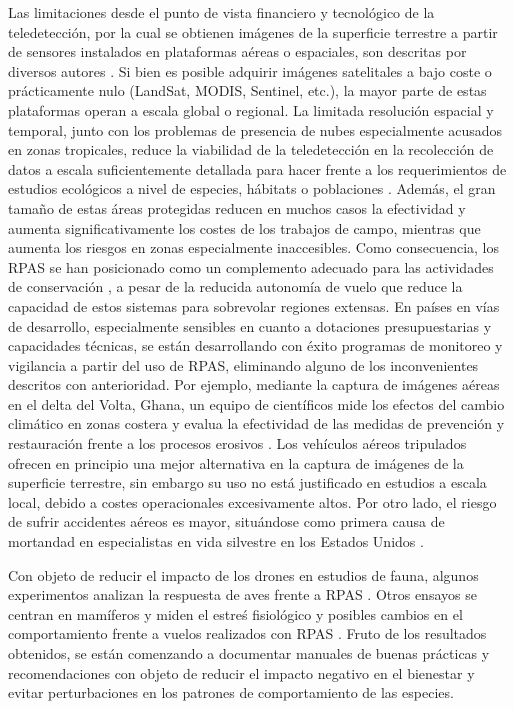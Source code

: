 \documentclass[onecolumn]{extarticle}
\begin{document}
Las limitaciones desde el punto de vista financiero y tecnológico de la
teledetección, por la cual se obtienen imágenes de la superficie
terrestre a partir de sensores instalados en plataformas aéreas o
espaciales, son descritas por diversos autores
\citep{Koh2012, Rodriguez2012}. Si bien es posible adquirir imágenes
satelitales a bajo coste o prácticamente nulo (LandSat, MODIS, Sentinel,
etc.), la mayor parte de estas plataformas operan a escala global o
regional. La limitada resolución espacial y temporal, junto con los
problemas de presencia de nubes especialmente acusados en zonas
tropicales, reduce la viabilidad de la teledetección en la recolección
de datos a escala suficientemente detallada para hacer frente a los
requerimientos de estudios ecológicos a nivel de especies, hábitats o
poblaciones \citep{Wulder2004}. Además, el gran tamaño de estas áreas
protegidas reducen en muchos casos la efectividad y aumenta
significativamente los costes de los trabajos de campo, mientras que
aumenta los riesgos en zonas especialmente inaccesibles. Como
consecuencia, los RPAS se han posicionado como un complemento adecuado
para las actividades de conservación \citep{Zahawi2015}, a pesar de la
reducida autonomía de vuelo que reduce la capacidad de estos sistemas
para sobrevolar regiones extensas. En países en vías de desarrollo,
especialmente sensibles en cuanto a dotaciones presupuestarias y
capacidades técnicas, se están desarrollando con éxito programas de
monitoreo y vigilancia a partir del uso de RPAS, eliminando alguno de
los inconvenientes descritos con anterioridad. Por ejemplo, mediante la
captura de imágenes aéreas en el delta del Volta, Ghana, un equipo de
científicos mide los efectos del cambio climático en zonas costera y
evalua la efectividad de las medidas de prevención y restauración frente
a los procesos erosivos \citep{Georg2016}. Los vehículos aéreos
tripulados ofrecen en principio una mejor alternativa en la captura de
imágenes de la superficie terrestre, sin embargo su uso no está
justificado en estudios a escala local, debido a costes operacionales
excesivamente altos. Por otro lado, el riesgo de sufrir accidentes
aéreos es mayor, situándose como primera causa de mortandad en
especialistas en vida silvestre en los Estados Unidos \citep{Sasse2003}.

Con objeto de reducir el impacto de los drones en estudios de fauna,
algunos experimentos analizan la respuesta de aves frente a RPAS
\citep{Vas2015}. Otros ensayos se centran en mamíferos y miden el estreś
fisiológico y posibles cambios en el comportamiento frente a vuelos
realizados con RPAS \citep{Ditmer2015}. Fruto de los resultados
obtenidos, se están comenzando a documentar manuales de buenas prácticas
y recomendaciones con objeto de reducir el impacto negativo en el
bienestar y evitar perturbaciones en los patrones de comportamiento de
las especies.
\end{document}
